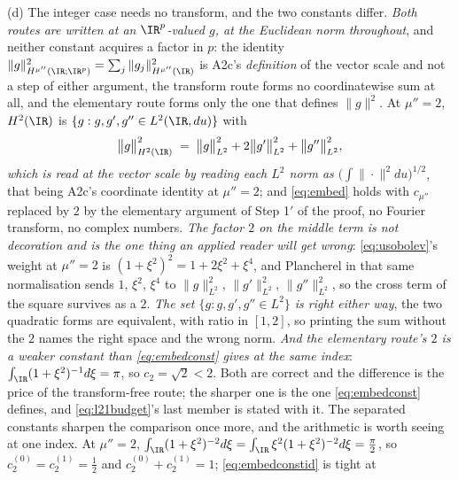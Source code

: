\begin{remark}
\textup{(d)} The integer case needs no transform, and the two constants differ. \emph{Both routes
are written at an $\IR^{p}$-valued $g$, at the Euclidean norm throughout}, and neither constant acquires
a factor in $p$: the identity
$\|g\|^{2}_{H^{\mu''}(\IR;\IR^{p})}=\sum_j\|g_j\|^{2}_{H^{\mu''}(\IR)}$ is A2c's \emph{definition} of the
vector scale and not a step of either argument, the transform route forms no coordinatewise sum at
all, and the elementary route forms only the one that defines $\|g\|^{2}$. At $\mu''=2$,
$H^{2}(\IR)$ is $\{g:g,g',g''\in L^{2}(\IR,du)\}$ with
\begin{equation}\label{eq:h2norm}
\big\|g\big\|^{2}_{H^{2}(\IR)}\;=\;\big\|g\big\|^{2}_{L^{2}}+2\big\|g'\big\|^{2}_{L^{2}}+\big\|g''\big\|^{2}_{L^{2}} ,
\end{equation}
\emph{which is read at the vector scale by reading each $L^{2}$ norm as
$\big(\int\|\cdot\|^{2}du\big)^{1/2}$}, that being A2c's coordinate identity at $\mu''=2$;
and \eqref{eq:embed} holds
with $c_{\mu''}$ replaced by $2$ by the elementary argument of Step 1$'$ of the proof, no Fourier
transform, no complex numbers. \emph{The factor $2$ on the middle term is not decoration and is the one
thing an applied reader will get wrong}: \eqref{eq:usobolev}'s weight at $\mu''=2$ is
$(1+\xi^{2})^{2}=1+2\xi^{2}+\xi^{4}$, and Plancherel in that same normalisation sends $1$, $\xi^{2}$,
$\xi^{4}$ to $\|g\|^{2}_{L^{2}}$, $\|g'\|^{2}_{L^{2}}$, $\|g''\|^{2}_{L^{2}}$, so the cross term of the
square survives as a $2$. \emph{The set $\{g:g,g',g''\in L^{2}\}$ is right either way}, the two
quadratic forms are equivalent, with ratio in $[1,2]$, so printing the sum without the $2$
names the right space and the wrong norm. \emph{And the elementary route's $2$ is a
weaker constant than \eqref{eq:embedconst} gives at the
same index}: $\int_{\IR}(1+\xi^{2})^{-1}d\xi=\pi$, so $c_{2}=\sqrt2<2$. Both are correct and the
difference is the price of the transform-free route; the sharper one is the one \eqref{eq:embedconst}
defines, and \eqref{eq:l21budget}'s last member is stated with it. The separated constants sharpen
the comparison once more, and the arithmetic is worth seeing at one index. At $\mu''=2$,
$\int_{\IR}(1+\xi^{2})^{-2}d\xi=\int_{\IR}\xi^{2}(1+\xi^{2})^{-2}d\xi=\tfrac\pi2$, so
$c^{(0)}_{2}=c^{(1)}_{2}=\tfrac12$ and $c^{(0)}_{2}+c^{(1)}_{2}=1$; \eqref{eq:embedconstid} is tight at

\end{remark}
